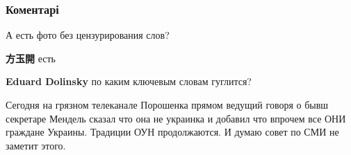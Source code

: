  
 
 
 
 
\subsubsection{Коментарі}
\label{sec:28_07_2021.fb.dolinskij_eduard.1.foto_oun_upa_listovka_evrei.cmt}

\begin{itemize}
 
А есть фото без цензурирования слов?

\begin{itemize}
 
\textbf{方玉開} есть

 
\textbf{Eduard Dolinsky} по каким ключевым словам гуглится?
\end{itemize}

 

Сегодня на грязном телеканале Порошенка прямом ведущий говоря о бывш секретаре
Мендель сказал что она не украинка и добавил что впрочем все ОНИ граждане
Украины. Традиции ОУН продолжаются. И думаю совет по СМИ не заметит этого.


\end{itemize}

